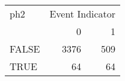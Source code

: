 \begin{tabular}{lrr}
   \hline
  ph2&  \multicolumn{2}{c}{Event Indicator}   \\  
&0& 1\\ 
\hline
FALSE & 3376 & 509 \\ 
  TRUE & 64 & 64 \\ 
   \hline
\end{tabular}

